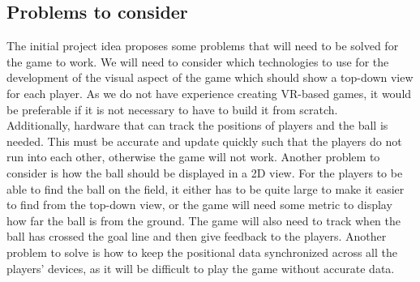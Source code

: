 \subsection{Problems to consider}
The initial project idea proposes some problems that will need to be solved for the game to work.
We will need to consider which technologies to use for the development of the visual aspect of the game which should show a top-down view for each player. 
As we do not have experience creating VR-based games, it would be preferable if it is not necessary to have to build it from scratch.\\
Additionally, hardware that can track the positions of players and the ball is needed.
This must be accurate and update quickly such that the players do not run into each other, otherwise the game will not work.
Another problem to consider is how the ball should be displayed in a 2D view.
For the players to be able to find the ball on the field, it either has to be quite large to make it easier to find from the top-down view, or the game will need some metric to display how far the ball is from the ground.
The game will also need to track when the ball has crossed the goal line and then give feedback to the players.
Another problem to solve is how to keep the positional data synchronized across all the players' devices, as it will be difficult to play the game without accurate data.
